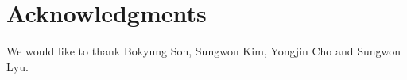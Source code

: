 \section*{Acknowledgments}
We would like to thank Bokyung Son, Sungwon Kim, Yongjin Cho and Sungwon Lyu.